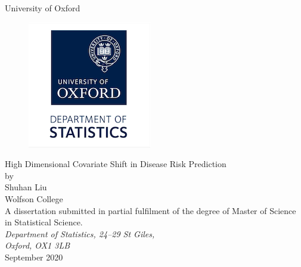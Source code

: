 \documentclass[a4paper,12pt]{article}
\begin{document}
\begin{titlepage}
\begin{center}
\vspace{1cm}
\textsf{\Huge{University of Oxford \\}}
\vspace{1cm}
\begin{figure}[htb]
\centering
\includegraphics[scale=.8]{Stats_Logo.png}
\end{figure}
\vspace{2.0cm}
\Huge{High Dimensional Covariate Shift in Disease Risk Prediction\\}
\vspace{2.0cm}
\large{ by \\[14pt] Shuhan Liu \\[8pt]Wolfson  College} \\
\vspace{2.2cm}
\large{A dissertation submitted in partial fulfilment of the degree of Master of Science in Statistical Science.
} \\
\vspace{.5cm}
\large{\emph{Department of Statistics, 24--29 St Giles, \\Oxford, OX1 3LB}} \\
\vspace{1.0cm}
\large{September 2020} \\
\end{center}
\end{titlepage}
\clearpage
\end{document}
